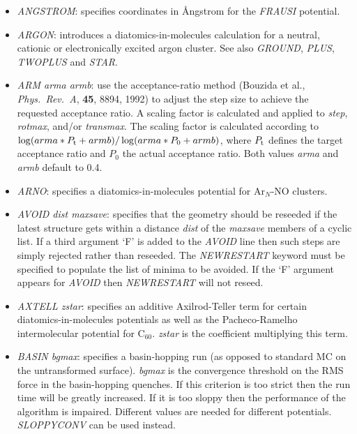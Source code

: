 \documentclass[12pt,a4paper,dvips]{article}
\begin{document}
\begin{itemize}
\item {\it ANGSTROM\/}: specifies coordinates in \AA ngstrom for the {\it FRAUSI\/}
potential.

\item {\it ARGON\/}: introduces a diatomics-in-molecules calculation for
a neutral, cationic or electronically excited argon cluster. See also
{\it GROUND\/}, {\it PLUS\/}, {\it TWOPLUS\/} and {\it STAR\/}.

\item{\it ARM arma armb}: use the acceptance-ratio method (Bouzida et al., {\it Phys.~Rev.~A},
{\bf 45}, 8894, 1992)  to adjust the step size to achieve the requested 
acceptance ratio. A scaling factor is calculated and applied to {\it step}, {\it rotmax},
and/or {\it transmax}. The scaling factor is calculated according to 
$\log(arma*P_{\rm t}+armb)/\log(arma*P_0+armb)$, where $P_{\rm t}$ defines the
target acceptance ratio and $P_0$ the actual acceptance ratio. Both values {\it arma} and
{\it armb} default to 0.4.

\item {\it ARNO\/}: specifies a diatomics-in-molecules potential for Ar$_N$-NO clusters.

\item {\it AVOID dist maxsave}: specifies that the geometry should be reseeded if the
latest structure gets within a distance {\it dist} of the {\it maxsave} members of a
cyclic list. If a third argument `F' is added to the {\it AVOID\/} line then such 
steps are simply rejected rather than reseeded.
The {\it NEWRESTART\/} keyword must be specified to populate the list of
minima to be avoided. If the `F' argument appears for {\it AVOID\/} then
{\it NEWRESTART\/} will not reseed.

\item {\it AXTELL zstar\/}: specifies an additive Axilrod-Teller term for certain
diatomics-in-molecules potentials as well as the Pacheco-Ramelho intermolecular potential for
C$_{60}$.\cite{pachecor97} 
{\it zstar\/} is the coefficient multiplying this term.

\item {\it BASIN bgmax\/}: specifies a basin-hopping run (as opposed to standard MC
on the untransformed surface). {\it bgmax\/} is the convergence threshold
on the RMS force in the basin-hopping
quenches. If this criterion is too strict then the run time will be greatly increased.
If it is too sloppy then the performance of the algorithm is impaired. Different values
are needed for different potentials. {\it SLOPPYCONV} can be used instead.


\end{itemize}
\end{document}
